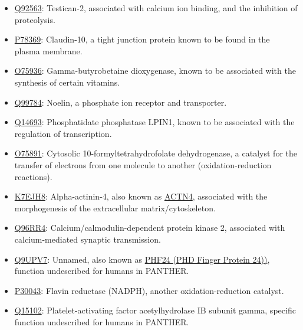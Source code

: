 \begin{itemize}
\item \href{http://www.pantherdb.org/genes/gene.do?acc=HUMAN\%7CHGNC\%3D13564\%7CUniProtKB\%3DQ92563}{Q92563}: Testican-2, associated with calcium ion binding, and the inhibition of proteolysis.
\item \href{http://www.pantherdb.org/genes/gene.do?acc=HUMAN\%7CHGNC\%3D2033\%7CUniProtKB\%3DP78369}{P78369}: Claudin-10,  a tight junction protein known to be found in the plasma membrane.
\item \href{http://www.pantherdb.org/genes/gene.do?acc=HUMAN\%7CHGNC\%3D964\%7CUniProtKB\%3DO75936}{O75936}: Gamma-butyrobetaine dioxygenase, known to be associated with the synthesis of certain vitamins.
\item \href{http://www.pantherdb.org/genes/gene.do?acc=HUMAN\%7CHGNC\%3D17187\%7CUniProtKB\%3DQ99784}{Q99784}: Noelin, a phosphate ion receptor and transporter.
\item \href{http://www.pantherdb.org/genes/gene.do?acc=HUMAN\%7CHGNC\%3D13345\%7CUniProtKB\%3DQ14693}{Q14693}: Phosphatidate phosphatase LPIN1, known to be associated with the regulation of transcription.
\item \href{http://www.pantherdb.org/genes/gene.do?acc=HUMAN\%7CHGNC\%3D3978\%7CUniProtKB\%3DO75891}{O75891}: Cytosolic 10-formyltetrahydrofolate dehydrogenase, a catalyst for the transfer of electrons from one molecule to another (oxidation-reduction reactions).
\item \href{http://www.pantherdb.org/genes/gene.do?acc=HUMAN\%7CHGNC\%3D166\%7CUniProtKB\%3DO43707}{K7EJH8}: Alpha-actinin-4, also known as \href{https://www.uniprot.org/uniprot/K7EJH8}{ACTN4}, associated with the morphogenesis of the extracellular matrix/cytoskeleton.
\item \href{http://www.pantherdb.org/genes/gene.do?acc=HUMAN\%7CHGNC\%3D1470\%7CUniProtKB\%3DQ96RR4}{Q96RR4}: Calcium/calmodulin-dependent protein kinase 2, associated with calcium-mediated synaptic transmission.
\item \href{http://www.pantherdb.org/genes/gene.do?acc=HUMAN\%7CHGNC\%3D29180\%7CUniProtKB\%3DQ9UPV7}{Q9UPV7}: Unnamed, also known as \href{https://www.uniprot.org/uniprot/Q9UPV7}{PHF24 (PHD Finger Protein 24))}, function undescribed for humans in PANTHER.
\item \href{http://www.pantherdb.org/genes/gene.do?acc=HUMAN\%7CHGNC\%3D1063\%7CUniProtKB\%3DP30043}{P30043}: Flavin reductase (NADPH), another oxidation-reduction catalyst.
\item \href{http://www.pantherdb.org/genes/gene.do?acc=HUMAN\%7CHGNC\%3D8576\%7CUniProtKB\%3DQ15102}{Q15102}: Platelet-activating factor acetylhydrolase IB subunit gamma, specific function undescribed for humans in PANTHER.

\end{itemize}
